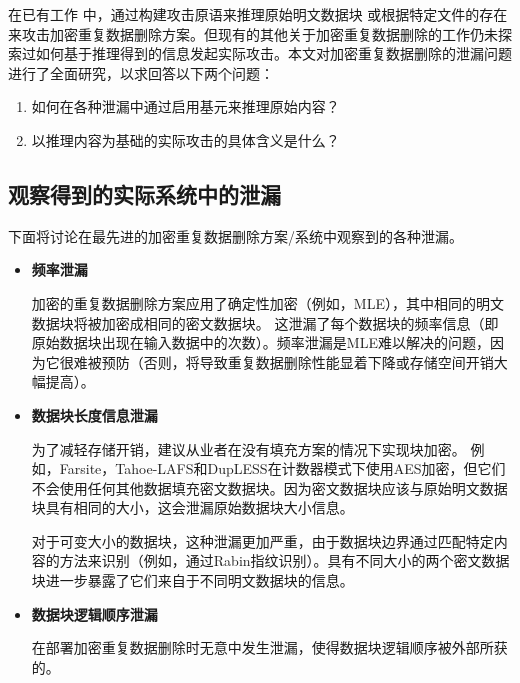 在已有工作 中，通过构建攻击原语来推理原始明文数据块 或根据特定文件的存在来攻击加密重复数据删除方案。但现有的其他关于加密重复数据删除的工作仍未探索过如何基于推理得到的信息发起实际攻击。本文对加密重复数据删除的泄漏问题进行了全面研究，以求回答以下两个问题：
\begin{enumerate}
    \item 如何在各种泄漏中通过启用基元来推理原始内容？
    \item 以推理内容为基础的实际攻击的具体含义是什么？
\end{enumerate}

\subsection{观察得到的实际系统中的泄漏}

下面将讨论在最先进的加密重复数据删除方案/系统中观察到的各种泄漏。


\begin{itemize}
    \item \textbf{频率泄漏}
    
    加密的重复数据删除方案应用了确定性加密（例如，MLE），其中相同的明文数据块将被加密成相同的密文数据块。 这泄漏了每个数据块的频率信息（即原始数据块出现在输入数据中的次数）。频率泄漏是MLE难以解决的问题，因为它很难被预防（否则，将导致重复数据删除性能显着下降或存储空间开销大幅提高）。
    \item \textbf{数据块长度信息泄漏}
    
    为了减轻存储开销，建议从业者在没有填充方案的情况下实现块加密。 例如，Farsite，Tahoe-LAFS和DupLESS在计数器模式下使用AES加密，但它们不会使用任何其他数据填充密文数据块。因为密文数据块应该与原始明文数据块具有相同的大小，这会泄漏原始数据块大小信息。
    
    对于可变大小的数据块，这种泄漏更加严重，由于数据块边界通过匹配特定内容的方法来识别（例如，通过Rabin指纹识别）。具有不同大小的两个密文数据块进一步暴露了它们来自于不同明文数据块的信息。
    
    \item \textbf{数据块逻辑顺序泄漏}

    在部署加密重复数据删除时无意中发生泄漏，使得数据块逻辑顺序被外部所获的。
\end{itemize}

